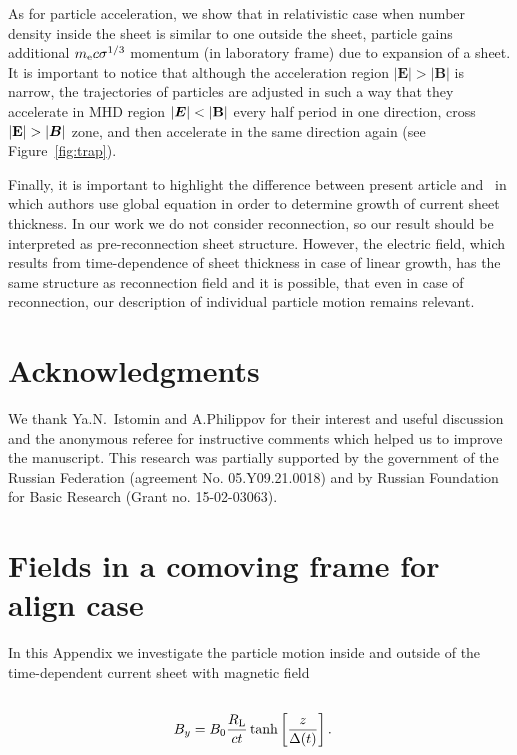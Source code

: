 \documentclass[useAMS,usenatbib]{mn2e}
\begin{document}
{ As for particle acceleration, we show that in relativistic case when number
density inside the sheet is similar to one outside the sheet, particle gains additional
$m_{\rm e}c\sigma^{1/3}$ momentum (in laboratory frame) due to expansion of a sheet. It is
important to notice that although the acceleration region $|{\boldsymbol E}| > |{\boldsymbol B}|$ is
narrow, the trajectories of particles are adjusted in such a way that they accelerate 
in MHD region $|{\boldsymbol E}| < |{\bf B}|$ every half period in one direction, cross 
$|{\bf E}| > |{\boldsymbol B}|$ zone, and then accelerate in the same direction again 
(see Figure~\ref{fig:trap}). }

Finally, it is important to highlight the difference between present article and~\citet{2001PASA...18..415K} in which authors use global equation in order to 
determine growth of current sheet thickness. In our work we do not consider 
reconnection, so our result should be interpreted as pre-reconnection sheet structure.
{ However, the electric field, which results from time-dependence of sheet 
thickness in case of linear growth, has the same structure as reconnection field  
and it is possible, that even in case of reconnection, our description of 
individual particle motion remains relevant.}

\section{Acknowledgments}

We thank Ya.N.~Istomin and A.Philippov for their interest and useful discussion 
{ and the anonymous referee for instructive comments which helped us to improve 
the manuscript}. This research was partially supported by the government of the 
Russian Federation (agreement No. 05.Y09.21.0018) and by Russian Foundation for 
Basic Research (Grant no. 15-02-03063). 



{\small


%
}
\bsp
\appendix
\section{Fields in a comoving frame for align case}
\label{Appendix.align}

In this Appendix we investigate the particle motion inside and outside of
the time-dependent current sheet with magnetic field
\begin{align}
\label{eqn:B1}\\
B_y & = B_0 \frac{R_{\rm L}}{ct} \tanh\left[\frac{z}{\Delta(t)}\right]. 
\label{eqn:B2}
\end{align}
\end{document}
